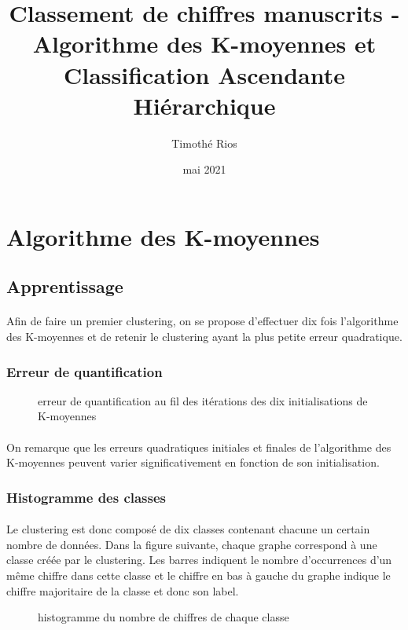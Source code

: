 \documentclass{article}
\title{Classement de chiffres manuscrits - Algorithme des K-moyennes et Classification Ascendante Hiérarchique}
\author{Timothé Rios}
\date{mai 2021}
\begin{document}
\maketitle
\newpage
\tableofcontents
\newpage
 

\section{Algorithme des K-moyennes}
\subsection{Apprentissage}
\paragraph{}Afin de faire un premier clustering, on se propose d'effectuer dix fois l'algorithme des K-moyennes et de retenir le clustering ayant la plus petite erreur quadratique.
\subsubsection{Erreur de quantification}
\begin{figure}[h]
\centering

 \caption{erreur de quantification au fil des itérations des dix initialisations de K-moyennes}
\end{figure}
\paragraph{}On remarque que les erreurs quadratiques initiales et finales de l'algorithme des K-moyennes peuvent varier significativement en fonction de son initialisation.
\subsubsection{Histogramme des classes}
\paragraph{}Le clustering est donc composé de dix classes contenant chacune un certain nombre de données. Dans la figure suivante, chaque graphe correspond à une classe créée par le clustering. Les barres indiquent le nombre d'occurrences d'un même chiffre dans cette classe et le chiffre en bas à gauche du graphe indique le chiffre majoritaire de la classe et donc son label.
\begin{figure}[H]
    \centering
    \caption{histogramme du nombre de chiffres de chaque classe}
    \label{fig:hist_10}
\end{figure}
\end{document}
